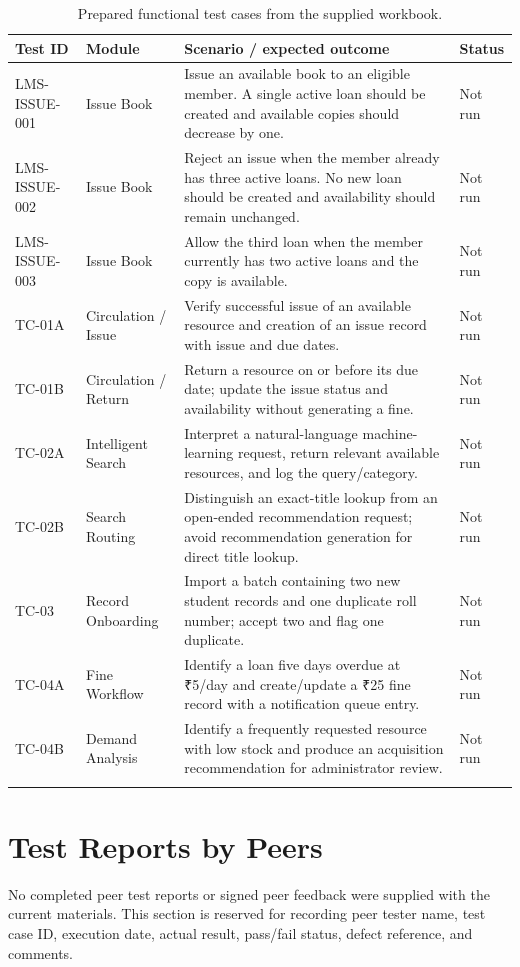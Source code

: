 \documentclass[12pt,a4paper]{report}
\begin{document}
\small
\begin{longtable}{p{1.55cm}p{2.5cm}p{5.2cm}p{2.1cm}}
\toprule
\textbf{Test ID} & \textbf{Module} & \textbf{Scenario / expected outcome} & \textbf{Status}\\
\midrule
LMS-ISSUE-001 & Issue Book & Issue an available book to an eligible member. A single active loan should be created and available copies should decrease by one. & Not run\\
LMS-ISSUE-002 & Issue Book & Reject an issue when the member already has three active loans. No new loan should be created and availability should remain unchanged. & Not run\\
LMS-ISSUE-003 & Issue Book & Allow the third loan when the member currently has two active loans and the copy is available. & Not run\\
TC-01A & Circulation / Issue & Verify successful issue of an available resource and creation of an issue record with issue and due dates. & Not run\\
TC-01B & Circulation / Return & Return a resource on or before its due date; update the issue status and availability without generating a fine. & Not run\\
TC-02A & Intelligent Search & Interpret a natural-language machine-learning request, return relevant available resources, and log the query/category. & Not run\\
TC-02B & Search Routing & Distinguish an exact-title lookup from an open-ended recommendation request; avoid recommendation generation for direct title lookup. & Not run\\
TC-03 & Record Onboarding & Import a batch containing two new student records and one duplicate roll number; accept two and flag one duplicate. & Not run\\
TC-04A & Fine Workflow & Identify a loan five days overdue at ₹5/day and create/update a ₹25 fine record with a notification queue entry. & Not run\\
TC-04B & Demand Analysis & Identify a frequently requested resource with low stock and produce an acquisition recommendation for administrator review. & Not run\\
\bottomrule
\caption{Prepared functional test cases from the supplied workbook.}
\end{longtable}
\normalsize

\section{Test Reports by Peers}
No completed peer test reports or signed peer feedback were supplied with the current materials. This section is reserved for recording peer tester name, test case ID, execution date, actual result, pass/fail status, defect reference, and comments.
\end{document}
